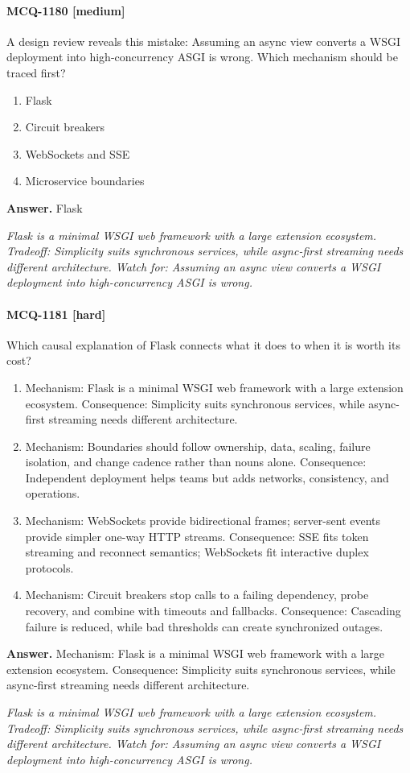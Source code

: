 \paragraph{MCQ-1180 [medium]} A design review reveals this mistake: Assuming an async view converts a WSGI deployment into high-concurrency ASGI is wrong. Which mechanism should be traced first?
\begin{enumerate}[label=\Alph*.]
\item Flask
\item Circuit breakers
\item WebSockets and SSE
\item Microservice boundaries
\end{enumerate}
\noindent\textbf{Answer.} Flask
\par\textit{Flask is a minimal WSGI web framework with a large extension ecosystem. Tradeoff: Simplicity suits synchronous services, while async-first streaming needs different architecture. Watch for: Assuming an async view converts a WSGI deployment into high-concurrency ASGI is wrong.}
\paragraph{MCQ-1181 [hard]} Which causal explanation of Flask connects what it does to when it is worth its cost?
\begin{enumerate}[label=\Alph*.]
\item Mechanism: Flask is a minimal WSGI web framework with a large extension ecosystem. Consequence: Simplicity suits synchronous services, while async-first streaming needs different architecture.
\item Mechanism: Boundaries should follow ownership, data, scaling, failure isolation, and change cadence rather than nouns alone. Consequence: Independent deployment helps teams but adds networks, consistency, and operations.
\item Mechanism: WebSockets provide bidirectional frames; server-sent events provide simpler one-way HTTP streams. Consequence: SSE fits token streaming and reconnect semantics; WebSockets fit interactive duplex protocols.
\item Mechanism: Circuit breakers stop calls to a failing dependency, probe recovery, and combine with timeouts and fallbacks. Consequence: Cascading failure is reduced, while bad thresholds can create synchronized outages.
\end{enumerate}
\noindent\textbf{Answer.} Mechanism: Flask is a minimal WSGI web framework with a large extension ecosystem. Consequence: Simplicity suits synchronous services, while async-first streaming needs different architecture.
\par\textit{Flask is a minimal WSGI web framework with a large extension ecosystem. Tradeoff: Simplicity suits synchronous services, while async-first streaming needs different architecture. Watch for: Assuming an async view converts a WSGI deployment into high-concurrency ASGI is wrong.}
